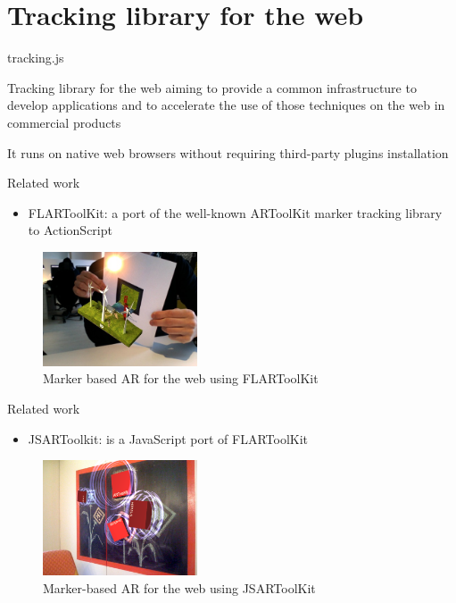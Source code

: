 \documentclass{beamer}
\begin{document}
\section{Tracking library for the web}

\begin{frame}{tracking.js}
  \begin{block}{}
      Tracking library for the web aiming to provide a common infrastructure to develop applications and to accelerate the use of those techniques on the web in commercial products
  \end{block}
  \begin{block}{}
      It runs on native web browsers without requiring third-party plugins installation
  \end{block}
\end{frame}
\begin{frame}{Related work}
  \begin{itemize}
    \item FLARToolKit: a port of the well-known ARToolKit marker tracking library to ActionScript
  \end{itemize}
  \begin{figure}[!htb]
    \centering
    \includegraphics[width=130pt]{../chapters/tracking_library_for_the_web/flartoolkit.png}
    \caption{Marker based AR for the web using FLARToolKit}
    \label{figure:flartoolkit}
  \end{figure}
\end{frame}
\begin{frame}{Related work}
  \begin{itemize}
    \item JSARToolkit: is a JavaScript port of FLARToolKit
  \end{itemize}
  \begin{figure}[!htb]
    \centering
    \includegraphics[width=130pt]{../chapters/tracking_library_for_the_web/jsartoolkit.png}
    \caption{Marker-based AR for the web using JSARToolKit}
    \label{figure:jsartoolkit}
  \end{figure}
\end{frame}
\end{document}
